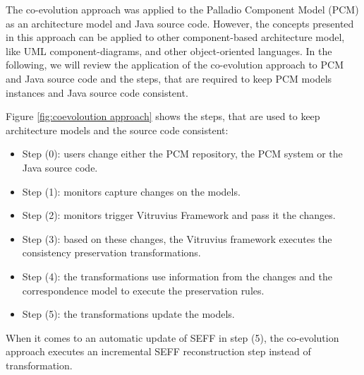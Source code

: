 The co-evolution approach was applied to the Palladio Component Model (PCM) as an architecture model and Java source code.  However, the concepts presented in this approach can be applied to other component-based architecture model, like UML component-diagrams, and other object-oriented languages. In the following, we will review the application of the co-evolution approach to PCM and Java source code and the steps, that are required to keep PCM models instances and Java source code consistent. 



Figure  \ref{fig:coevoloution approach} shows the steps, that are used to keep architecture models and the source code consistent:

\begin{itemize}
\item Step (0): users change either the PCM repository, the PCM system or the Java source code.  
\item Step (1): monitors capture changes on the models.
\item Step (2):  monitors trigger Vitruvius Framework and pass it the changes.
\item Step (3): based on these changes, the Vitruvius framework executes the consistency preservation transformations. 
\item Step (4): the transformations use information from the changes and the correspondence model to execute the preservation rules.
\item Step (5): the transformations update the models. 
\end{itemize}

When it comes to an automatic update of SEFF in step (5), the co-evolution approach executes an incremental SEFF reconstruction step instead of transformation. 



